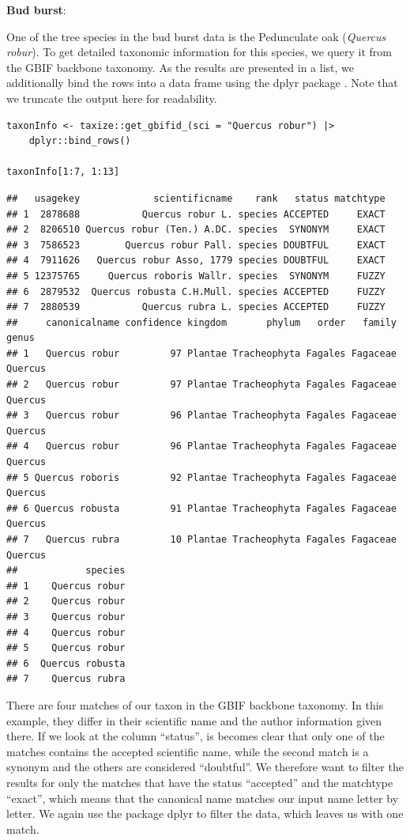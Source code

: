 \documentclass[
  oneside]{book}
\begin{document}
\begin{examplebox}

\textbf{Bud burst}:

One of the tree species in the bud burst data is the Pedunculate oak (\emph{Quercus robur}). To get detailed taxonomic information for this species, we query it from the GBIF backbone taxonomy. As the results are presented in a list, we additionally bind the rows into a data frame using the dplyr package \autocite{dplyr_2023}. Note that we truncate the output here for readability.

\begin{verbatim}
taxonInfo <- taxize::get_gbifid_(sci = "Quercus robur") |>
    dplyr::bind_rows()

taxonInfo[1:7, 1:13]
\end{verbatim}

\begin{verbatim}
##   usagekey             scientificname    rank   status matchtype
## 1  2878688           Quercus robur L. species ACCEPTED     EXACT
## 2  8206510 Quercus robur (Ten.) A.DC. species  SYNONYM     EXACT
## 3  7586523        Quercus robur Pall. species DOUBTFUL     EXACT
## 4  7911626   Quercus robur Asso, 1779 species DOUBTFUL     EXACT
## 5 12375765     Quercus roboris Wallr. species  SYNONYM     FUZZY
## 6  2879532  Quercus robusta C.H.Mull. species ACCEPTED     FUZZY
## 7  2880539           Quercus rubra L. species ACCEPTED     FUZZY
##     canonicalname confidence kingdom       phylum   order   family   genus
## 1   Quercus robur         97 Plantae Tracheophyta Fagales Fagaceae Quercus
## 2   Quercus robur         97 Plantae Tracheophyta Fagales Fagaceae Quercus
## 3   Quercus robur         96 Plantae Tracheophyta Fagales Fagaceae Quercus
## 4   Quercus robur         96 Plantae Tracheophyta Fagales Fagaceae Quercus
## 5 Quercus roboris         92 Plantae Tracheophyta Fagales Fagaceae Quercus
## 6 Quercus robusta         91 Plantae Tracheophyta Fagales Fagaceae Quercus
## 7   Quercus rubra         10 Plantae Tracheophyta Fagales Fagaceae Quercus
##            species
## 1    Quercus robur
## 2    Quercus robur
## 3    Quercus robur
## 4    Quercus robur
## 5    Quercus robur
## 6  Quercus robusta
## 7    Quercus rubra
\end{verbatim}

There are four matches of our taxon in the GBIF backbone taxonomy. In this example, they differ in their scientific name and the author information given there. If we look at the column ``status'', is becomes clear that only one of the matches contains the accepted scientific name, while the second match is a synonym and the others are considered ``doubtful''. We therefore want to filter the results for only the matches that have the status ``accepted'' and the matchtype ``exact'', which means that the canonical name matches our input name letter by letter. We again use the package dplyr to filter the data, which leaves us with one match.

\end{examplebox}
\end{document}
